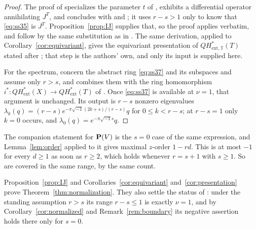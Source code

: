 \begin{proof}
  The proof of \cite[Theorem~4.6]{SS} specializes the parameter \(t\) of
  \cite[Theorem~4.4]{SS}, exhibits a differential operator annihilating
  \(J^{T}\), and concludes with \cite[Theorem~10.3.1]{CoxKatz} and
  \cite[Lemma~2]{Pandharipande}; it uses \(r-s>1\) only to know that
  \eqref{eq:ss35} is \(J^{T}\).  Proposition~\ref{prop:IJ} supplies that,
  so the proof applies verbatim, and \cite[(39)--(40)]{SS} follow by the
  same substitution as in \cite[Section~4.3]{SS}.  The same derivation,
  applied to Corollary~\ref{cor:equivariant}, gives the equivariant
  presentation of \(QH^{*}_{\mathrm{ext},\mathbb T}(T)\) stated after
  \cite[(81)]{SS}; that step is the authors' own, and only its input is
  supplied here.

  For the spectrum, \cite[Propositions~5.1 and~5.2]{SS} concern the abstract
  ring \eqref{eq:ss37} and its subspaces and assume only \(r>s\), and
  \cite[Corollary~5.3]{SS} combines them with the ring homomorphism
  \(i^{*}\colon QH^{*}_{\mathrm{ext}}(X)\to QH^{*}_{\mathrm{ext}}(T)\) of
  \cite[Theorem~3.3]{SS}.  Once \eqref{eq:ss37} is available at \(\nu=1\),
  that argument is unchanged.  Its output is \(r-s\) nonzero eigenvalues
  \(\lambda_{k}(q)=(r-s)e^{-\pi\sqrt{-1}(2k+s)/(r-s)}q\) for
  \(0\le k<r-s\); at \(r-s=1\) only \(k=0\) occurs, and
  \(\lambda_{0}(q)=e^{-\pi\sqrt{-1}s}q\).
\end{proof}

\begin{remark}
  \label{rem:pbundle}
  The companion statement \cite[(34)]{SS} for \(\mathbf P(V)\) is the \(s=0\) case
  of the same expression, and Lemma~\ref{lem:order} applied to it gives
  maximal \(z\)-order \(1-rd\).  This is at most \(-1\) for every \(d\ge1\)
  as soon as \(r\ge2\), which holds whenever \(r=s+1\) with \(s\ge1\).  So
  \cite[(34), (36) and~(38)]{SS} are covered in the same range, by the same
  count.
\end{remark}

Proposition~\ref{prop:IJ} and Corollaries~\ref{cor:equivariant}
and~\ref{cor:presentation} prove Theorem~\ref{thm:normalization}.  They also settle the status of
\cite[Remark~4.5(3)]{SS}: under the standing assumption \(r>s\) its range
\(r-s\le1\) is exactly \(\nu=1\), and by
Corollary~\ref{cor:normalized} and Remark~\ref{rem:boundary} its negative
assertion holds there only for \(s=0\).
